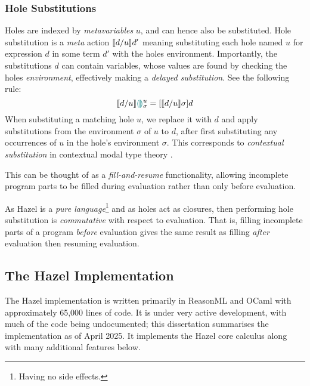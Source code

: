 \subsubsection{Hole Substitutions}\label{sec:HoleSubstitution}
Holes are indexed by \textit{metavariables} $u$, and can hence also be substituted. Hole substitution is a \textit{meta} action $\llbracket d/u \rrbracket d'$ meaning substituting each hole named $u$ for expression $d$ in some term $d'$ with the holes environment. Importantly, the substitutions $d$ can contain variables, whose values are found by checking the holes \textit{environment}, effectively making a \textit{delayed substitution}. See the following rule:
 \[\llbracket d/u \rrbracket {\color{teal}\llparenthesis}  {\color{teal}\rrparenthesis}^u_\sigma = [\llbracket d/u \rrbracket \sigma]d\]
When substituting a matching hole $u$, we replace it with $d$ and apply substitutions from the environment $\sigma$ of $u$ to $d$, after first substituting any occurrences of $u$ in the hole's environment $\sigma$. This corresponds to \textit{contextual substitution} in contextual modal type theory \cite{CMTT}.
 
 This can be thought of as a \textit{fill-and-resume} functionality, allowing incomplete program parts to be filled during evaluation rather than only before evaluation.

As Hazel is a \textit{pure language}\footnote{Having no side effects.} and as holes act as closures, then performing hole substitution is \textit{commutative} with respect to evaluation. That is, filling incomplete parts of a program \textit{before} evaluation gives the same result as filling \textit{after} evaluation then resuming evaluation.

\subsection{The Hazel Implementation}\label{sec:HazelImplementation}
The Hazel implementation \cite{HazelCode} is written primarily in ReasonML and OCaml with approximately 65,000 lines of code. It is under very active development, with much of the code being undocumented; this dissertation summarises the implementation as of April 2025. It implements the Hazel core calculus along with many additional features below. 

